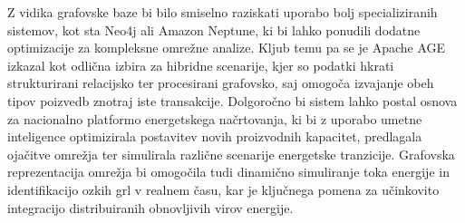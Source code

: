\documentclass[a4paper,12pt,openright]{book}
\begin{document}
Z vidika grafovske baze bi bilo smiselno raziskati uporabo bolj specializiranih sistemov, kot sta Neo4j ali Amazon Neptune, ki bi lahko ponudili dodatne optimizacije za kompleksne omrežne analize. Kljub temu pa se je Apache AGE izkazal kot odlična izbira za hibridne scenarije, kjer so podatki hkrati strukturirani relacijsko ter procesirani grafovsko, saj omogoča izvajanje obeh tipov poizvedb znotraj iste transakcije. Dolgoročno bi sistem lahko postal osnova za nacionalno platformo energetskega načrtovanja, ki bi z uporabo umetne inteligence optimizirala postavitev novih proizvodnih kapacitet, predlagala ojačitve omrežja ter simulirala različne scenarije energetske tranzicije. Grafovska reprezentacija omrežja bi omogočila tudi dinamično simuliranje toka energije in identifikacijo ozkih grl v realnem času, kar je ključnega pomena za učinkovito integracijo distribuiranih obnovljivih virov energije.





\raggedright



\printbibliography[heading=bibintoc,title={Literatura}]
\end{document}
